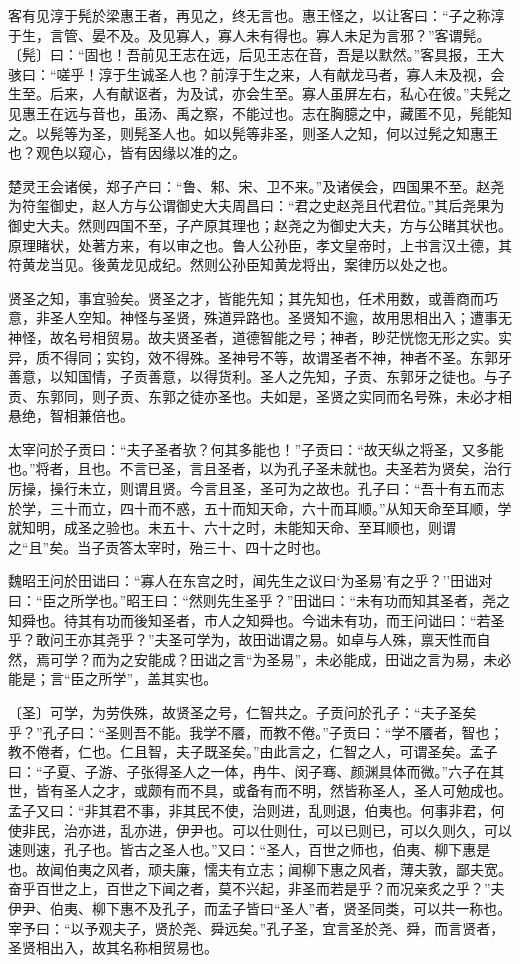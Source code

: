 \documentclass[]{article}
\begin{document}
客有见淳于髡於梁惠王者，再见之，终无言也。惠王怪之，以让客曰：``子之称淳于生，言管、晏不及。及见寡人，寡人未有得也。寡人未足为言邪？''客谓髡。〔髡〕曰：``固也！吾前见王志在远，后见王志在音，吾是以默然。''客具报，王大骇曰：``嗟乎！淳于生诚圣人也？前淳于生之来，人有献龙马者，寡人未及视，会生至。后来，人有献讴者，为及试，亦会生至。寡人虽屏左右，私心在彼。''夫髡之见惠王在远与音也，虽汤、禹之察，不能过也。志在胸臆之中，藏匿不见，髡能知之。以髡等为圣，则髡圣人也。如以髡等非圣，则圣人之知，何以过髡之知惠王也？观色以窥心，皆有因缘以准的之。

楚灵王会诸侯，郑子产曰：``鲁、邾、宋、卫不来。''及诸侯会，四国果不至。赵尧为符玺御史，赵人方与公谓御史大夫周昌曰：``君之史赵尧且代君位。''其后尧果为御史大夫。然则四国不至，子产原其理也；赵尧之为御史大夫，方与公睹其状也。原理睹状，处著方来，有以审之也。鲁人公孙臣，孝文皇帝时，上书言汉土德，其符黄龙当见。後黄龙见成纪。然则公孙臣知黄龙将出，案律历以处之也。

贤圣之知，事宜验矣。贤圣之才，皆能先知；其先知也，任术用数，或善商而巧意，非圣人空知。神怪与圣贤，殊道异路也。圣贤知不逾，故用思相出入；遭事无神怪，故名号相贸易。故夫贤圣者，道德智能之号；神者，眇茫恍惚无形之实。实异，质不得同；实钧，效不得殊。圣神号不等，故谓圣者不神，神者不圣。东郭牙善意，以知国情，子贡善意，以得货利。圣人之先知，子贡、东郭牙之徒也。与子贡、东郭同，则子贡、东郭之徒亦圣也。夫如是，圣贤之实同而名号殊，未必才相悬绝，智相兼倍也。

太宰问於子贡曰：``夫子圣者欤？何其多能也！''子贡曰：``故天纵之将圣，又多能也。''将者，且也。不言已圣，言且圣者，以为孔子圣未就也。夫圣若为贤矣，治行厉操，操行未立，则谓且贤。今言且圣，圣可为之故也。孔子曰：``吾十有五而志於学，三十而立，四十而不惑，五十而知天命，六十而耳顺。''从知天命至耳顺，学就知明，成圣之验也。未五十、六十之时，未能知天命、至耳顺也，则谓之``且''矣。当子贡答太宰时，殆三十、四十之时也。

魏昭王问於田诎曰：``寡人在东宫之时，闻先生之议曰`为圣易'有之乎？''田诎对曰：``臣之所学也。''昭王曰：``然则先生圣乎？''田诎曰：``未有功而知其圣者，尧之知舜也。待其有功而後知圣者，市人之知舜也。今诎未有功，而王问诎曰：``若圣乎？敢问王亦其尧乎？''夫圣可学为，故田诎谓之易。如卓与人殊，禀天性而自然，焉可学？而为之安能成？田诎之言``为圣易''，未必能成，田诎之言为易，未必能是；言``臣之所学''，盖其实也。

〔圣〕可学，为劳佚殊，故贤圣之号，仁智共之。子贡问於孔子：``夫子圣矣乎？''孔子曰：``圣则吾不能。我学不餍，而教不倦。''子贡曰：``学不餍者，智也；教不倦者，仁也。仁且智，夫子既圣矣。''由此言之，仁智之人，可谓圣矣。孟子曰：``子夏、子游、子张得圣人之一体，冉牛、闵子骞、颜渊具体而微。''六子在其世，皆有圣人之才，或颇有而不具，或备有而不明，然皆称圣人，圣人可勉成也。孟子又曰：``非其君不事，非其民不使，治则进，乱则退，伯夷也。何事非君，何使非民，治亦进，乱亦进，伊尹也。可以仕则仕，可以已则已，可以久则久，可以速则速，孔子也。皆古之圣人也。''又曰：``圣人，百世之师也，伯夷、柳下惠是也。故闻伯夷之风者，顽夫廉，懦夫有立志；闻柳下惠之风者，薄夫敦，鄙夫宽。奋乎百世之上，百世之下闻之者，莫不兴起，非圣而若是乎？而况亲炙之乎？''夫伊尹、伯夷、柳下惠不及孔子，而孟子皆曰``圣人''者，贤圣同类，可以共一称也。宰予曰：``以予观夫子，贤於尧、舜远矣。''孔子圣，宜言圣於尧、舜，而言贤者，圣贤相出入，故其名称相贸易也。
\end{document}
